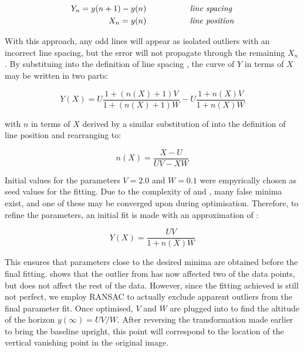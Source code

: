 {\begin{eqnarray}
Y_n = y(n+1)-y(n) & \mbox{~~~~~~~~~~~~~~~ \it line spacing} \label{linespacingsdefneqn} \\
X_n = y(n) & \mbox{~~~~~~~~~~~~~~~ \it line position} \label{linepositiondefneqn}
\end{eqnarray}

With this approach, any odd lines will appear as isolated outliers with an incorrect line spacing, but the error will not propagate through the remaining $X_n$. %
By substituing  into the definition of line spacing , the curve of $Y$ in terms of $X$ may be written in two parts:
}

\begin{equation}
Y(X) = U \frac{1+(n(X)+1)V}{1+(n(X)+1)W} - U \frac{1+n(X)V}{1+n(X)W}
\label{fittingeqn}
\end{equation}

{\parindent 0mm
with $n$ in terms of $X$ derived by a similar substitution of  into the definition of line position  and rearranging to:
}

\begin{equation}
n(X) = \frac{X-U}{UV-XW}
\label{nfromxeqn}
\end{equation}

Initial values for the parameters $V=2.0$ and $W=0.1$ were empyrically chosen as seed values for the fitting.
Due to the complexity of  and , many false minima exist, and one of these may be converged upon during optimisation.
Therefore, to refine the parameters, an initial fit is made with an approximation of :

\begin{equation}
Y(X) = \frac{ UV }{ 1+n(X)W }
\end{equation}

This ensures that parameters close to the desired minima are obtained before the final fitting.
 shows that the outlier from  has now affected two of the data points, but does not affect the rest of the data.
However, since the fitting achieved is still not perfect, we employ RANSAC to actually exclude apparent outliers from the final parameter fit.
Once optimised, $V$ and $W$ are plugged into  to find the altitude of the horizon $y(\infty) = UV/W$.
After reversing the transformation made earlier to bring the baseline upright, this point will correspond to the location of the vertical vanishing point in the original image.

